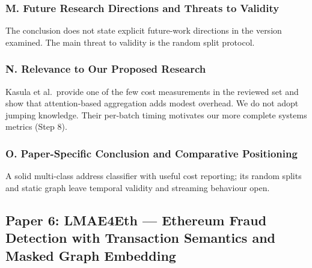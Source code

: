 \documentclass[11pt,a4paper]{article}
\begin{document}
\subsubsection*{M. Future Research Directions and Threats to Validity}
The conclusion does not state explicit future-work directions in the version examined. The main threat to validity is the random split protocol.

\subsubsection*{N. Relevance to Our Proposed Research}
Kasula et al.\ provide one of the few cost measurements in the reviewed set and show that attention-based aggregation adds modest overhead. We do not adopt jumping knowledge. Their per-batch timing motivates our more complete systems metrics (Step 8).

\subsubsection*{O. Paper-Specific Conclusion and Comparative Positioning}
A solid multi-class address classifier with useful cost reporting; its random splits and static graph leave temporal validity and streaming behaviour open.

\subsection{Paper 6: LMAE4Eth --- Ethereum Fraud Detection with Transaction Semantics and Masked Graph Embedding}
\label{sec:p6_lmae4eth}
\end{document}
